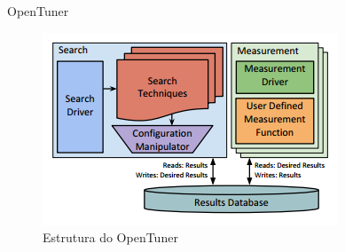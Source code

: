 \documentclass[10pt]{beamer}
\begin{document}
\begin{frame}{OpenTuner}
	\begin{figure}
	\centering
	\includegraphics[width=1\linewidth]{OpenTuner}
	\caption{Estrutura do OpenTuner}
	\label{fig:OpenTuner}
	\end{figure}
\end{frame}
%
%  
%
%
\end{document}
